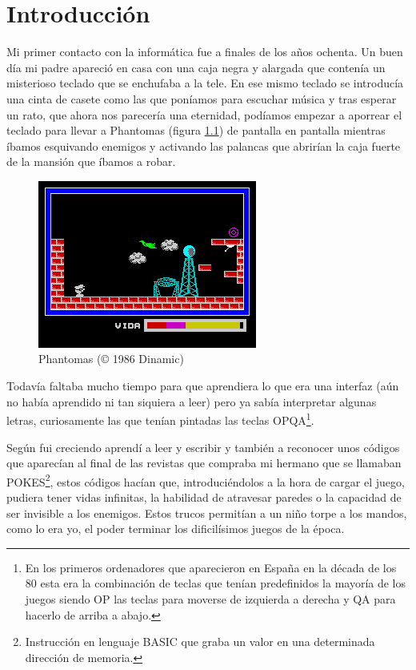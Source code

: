 \chapter{Introducción}

Mi primer contacto con la informática fue a finales de los años ochenta. Un buen día mi padre apareció en casa con una caja negra y alargada que contenía un misterioso teclado que se enchufaba a la tele. En ese mismo teclado se introducía una cinta de casete como las que poníamos para escuchar música y tras esperar un rato, que ahora nos parecería una eternidad, podíamos empezar a aporrear el teclado para llevar a Phantomas (figura \ref{fig:phantomas}) de pantalla en pantalla mientras íbamos esquivando enemigos y activando las palancas que abrirían la caja fuerte de la mansión que íbamos a robar.


\begin{figure}[h!]
\centering
\includegraphics{../images/phantomas-sp1}
\caption{Phantomas (© 1986 Dinamic)}
\label{fig:phantomas}
\end{figure}

\bigskip
Todavía faltaba mucho tiempo para que aprendiera lo que era una interfaz (aún no había aprendido ni tan siquiera a leer) pero ya sabía interpretar algunas letras, curiosamente las que tenían pintadas las teclas OPQA\footnote{En los primeros ordenadores que aparecieron en España en la década de los 80 esta era la combinación de teclas que tenían predefinidos la mayoría de los juegos siendo OP las teclas para moverse de izquierda a derecha y QA para hacerlo de arriba a abajo.}.

\bigskip
Según fui creciendo aprendí a leer y escribir y también a reconocer unos códigos que aparecían al final de las revistas que compraba mi hermano que se llamaban POKES\footnote{Instrucción en lenguaje BASIC que graba un valor en una determinada dirección de memoria.}, estos códigos hacían que, introduciéndolos a la hora de cargar el juego, pudiera tener vidas infinitas, la habilidad de atravesar paredes o la capacidad de ser invisible a los enemigos. Estos trucos permitían a un niño torpe a los mandos, como lo era yo, el poder terminar los dificilísimos juegos de la época.

